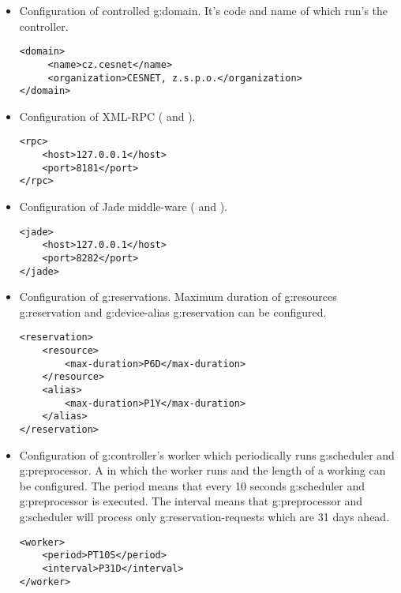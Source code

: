 \begin{itemize}
\item Configuration of controlled \gls{g:domain}. It's code  and name of  which run's the
controller.
\begin{verbatim}
<domain>
     <name>cz.cesnet</name>
     <organization>CESNET, z.s.p.o.</organization>
</domain>
\end{verbatim}

\item Configuration of XML-RPC ( and ).
\begin{verbatim}
<rpc>
    <host>127.0.0.1</host>
    <port>8181</port>
</rpc>
\end{verbatim}

\item Configuration of Jade middle-ware ( and ).
\begin{verbatim}
<jade>
    <host>127.0.0.1</host>
    <port>8282</port>
</jade>
\end{verbatim}

\item Configuration of \glspl{g:reservation}. Maximum duration of \glspl{g:resource} \gls{g:reservation} and \gls{g:device-alias} \gls{g:reservation} can be configured.
\begin{verbatim}
<reservation>
    <resource>
        <max-duration>P6D</max-duration>
    </resource>
    <alias>
        <max-duration>P1Y</max-duration>
    </alias>
</reservation>
\end{verbatim}

\item Configuration of \gls{g:controller}'s worker which periodically runs \gls{g:scheduler} and \gls{g:preprocessor}. A  in which the worker runs and the length of a working  can be configured. The  period means that every 10 seconds \gls{g:scheduler} and \gls{g:preprocessor} is executed. The  interval means that \gls{g:preprocessor} and \gls{g:scheduler} will process only \glspl{g:reservation-request} which are 31 days ahead.
\begin{verbatim}
<worker>
    <period>PT10S</period>
    <interval>P31D</interval>
</worker>
\end{verbatim}


\end{itemize}
